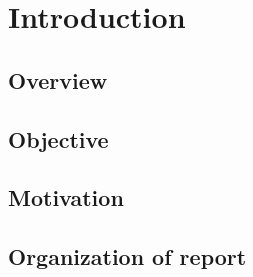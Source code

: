 \chapter{Introduction }
\hspace{0.26in} 

\section{Overview}
\hspace{0.26in}

\section{Objective}
\hspace{0.26in}

\section{Motivation}
\hspace{0.26in}


\section{Organization of report}
\hspace{0.26in}


